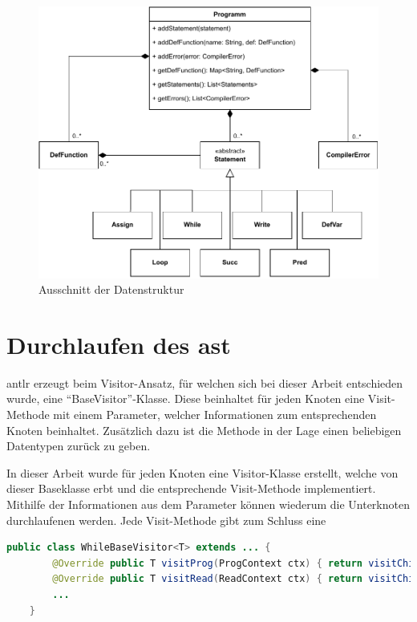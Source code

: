 \begin{figure}[h!]
	\centering
	\includegraphics[width=13cm]{content/pictures/ClassDia.pdf}
	\caption{Ausschnitt der Datenstruktur}
	\label{pic:Semantic-Struct}
\end{figure}

\section{Durchlaufen des \acl{ast}}
\ac{antlr} erzeugt beim Visitor-Ansatz, für welchen sich bei dieser Arbeit entschieden wurde, eine \enquote{BaseVisitor}-Klasse. Diese beinhaltet für jeden Knoten eine Visit-Methode mit einem Parameter, welcher Informationen zum entsprechenden Knoten beinhaltet. Zusätzlich dazu ist die Methode in der Lage einen beliebigen Datentypen zurück zu geben.

In dieser Arbeit wurde für jeden Knoten eine Visitor-Klasse erstellt, welche von dieser Baseklasse erbt und die entsprechende Visit-Methode implementiert. Mithilfe der Informationen aus dem Parameter können wiederum die Unterknoten durchlaufenen werden. Jede Visit-Methode gibt zum Schluss eine 

\begin{lstlisting}[language=java, caption=Inhalt der generierten BaseVisitor-Klasse, label={lst:parser-basevisitor}]
	public class WhileBaseVisitor<T> extends ... {
		@Override public T visitProg(ProgContext ctx) { return visitChildren(ctx); }
		@Override public T visitRead(ReadContext ctx) { return visitChildren(ctx); }
		...
	}
\end{lstlisting}